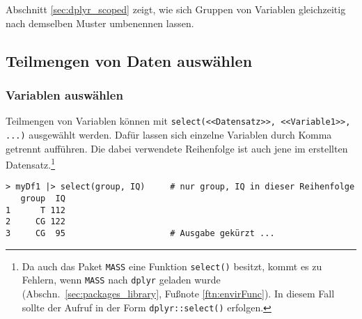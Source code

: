 Abschnitt \ref{sec:dplyr_scoped} zeigt, wie sich Gruppen von Variablen gleichzeitig nach demselben Muster umbenennen lassen.

\subsection{Teilmengen von Daten auswählen}
\label{sec:dplyr_subset}

\subsubsection{Variablen auswählen}

Teilmengen von Variablen können mit \lstinline!select(<<Datensatz>>, <<Variable1>>, ...)! ausgewählt werden. Dafür lassen sich einzelne Variablen durch Komma getrennt aufführen. Die dabei verwendete Reihenfolge ist auch jene im erstellten Datensatz.\footnote{\label{ftn:select_mass}Da auch das Paket \lstinline!MASS! eine Funktion \lstinline!select()! besitzt, kommt es zu Fehlern, wenn \lstinline!MASS! nach \lstinline!dplyr! geladen wurde (Abschn.\ \ref{sec:packages_library}, Fußnote \ref{ftn:envirFunc}). In diesem Fall sollte der Aufruf in der Form \lstinline!dplyr::select()! erfolgen.}
\begin{lstlisting}
> myDf1 |> select(group, IQ)     # nur group, IQ in dieser Reihenfolge
   group  IQ
1      T 112
2     CG 122
3     CG  95                     # Ausgabe gekürzt ...
\end{lstlisting}

